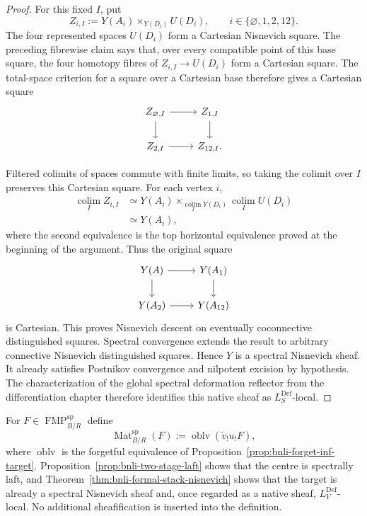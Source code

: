 \begin{proof}
For this fixed $I$, put
\[
    Z_{i,I}
    :=
    Y(A_i)\times_{Y(D_i)}U(D_i),
    \qquad
    i\in\{\varnothing,1,2,12\}.
\]
The four represented spaces $U(D_i)$ form a Cartesian Nisnevich square.
The preceding fibrewise claim says that, over every compatible point of this
base square, the four homotopy fibres of $Z_{i,I}\to U(D_i)$ form a
Cartesian square.  The total-space criterion for a square over a Cartesian
base therefore gives a Cartesian square
\[
\begin{tikzcd}
Z_{\varnothing,I} \arrow[r] \arrow[d] &
Z_{1,I} \arrow[d]\\
Z_{2,I} \arrow[r] &
Z_{12,I}.
\end{tikzcd}
\]

Filtered colimits of spaces commute with finite limits, so taking the colimit
over $I$ preserves this Cartesian square.  For each vertex $i$,
\[
\begin{aligned}
\operatorname*{colim}_I Z_{i,I}
&\simeq
Y(A_i)
\times_{\operatorname*{colim}_IY(D_i)}
\operatorname*{colim}_I U(D_i)\\
&\simeq
Y(A_i),
\end{aligned}
\]
where the second equivalence is the top horizontal equivalence proved at the
beginning of the argument.  Thus the original square
\[
\begin{tikzcd}
Y(A) \arrow[r] \arrow[d] &
Y(A_1) \arrow[d]\\
Y(A_2) \arrow[r] &
Y(A_{12})
\end{tikzcd}
\]
is Cartesian.  This proves Nisnevich descent on eventually coconnective
distinguished squares.  Spectral convergence extends the result to arbitrary
connective Nisnevich distinguished squares.  Hence $Y$ is a spectral
Nisnevich sheaf.  It already satisfies Postnikov convergence and nilpotent
excision by hypothesis.  The characterization of the global spectral
deformation reflector from the differentiation chapter therefore identifies
this native sheaf as $L_S^{\mathrm{Def}}$-local.
\end{proof}

\begin{definition}
\label{def:bnli-affine-materialization}
For $F\in\operatorname{FMP}^{\mathrm{sp}}_{B/R}$ define
\[
\boxed{
    \operatorname{Mat}^{\mathrm{sp}}_{B/R}(F)
    :=
    \operatorname{oblv}
    \left(
      \widetilde v_!u_!F
    \right),}
\]
where $\operatorname{oblv}$ is the forgetful equivalence of
Proposition~\ref{prop:bnli-forget-inf-target}.  Proposition~\ref{prop:bnli-two-stage-laft}
shows that the centre is spectrally laft, and
Theorem~\ref{thm:bnli-formal-stack-nisnevich} shows that the target is already
a spectral Nisnevich sheaf and, once regarded as a native sheaf,
$L_V^{\mathrm{Def}}$-local.  No additional sheafification is inserted into the
definition.
\end{definition}

